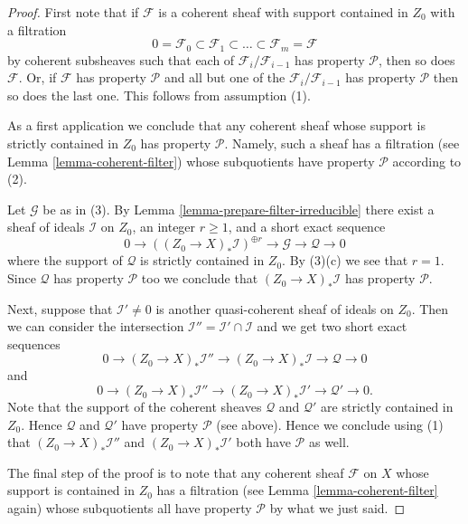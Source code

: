 \begin{proof}
First note that if $\mathcal{F}$ is a coherent sheaf with support
contained in $Z_0$ with a filtration
$$
0 = \mathcal{F}_0 \subset \mathcal{F}_1 \subset
\ldots \subset \mathcal{F}_m = \mathcal{F}
$$
by coherent subsheaves such that each of $\mathcal{F}_i/\mathcal{F}_{i - 1}$
has property $\mathcal{P}$, then so does $\mathcal{F}$. Or, if $\mathcal{F}$
has property $\mathcal{P}$ and all but one of the
$\mathcal{F}_i/\mathcal{F}_{i - 1}$ has property $\mathcal{P}$ then
so does the last one. This follows from assumption (1).

\medskip\noindent
As a first application we conclude that any coherent sheaf whose support
is strictly contained in $Z_0$ has property $\mathcal{P}$. Namely, such a
sheaf has a filtration (see Lemma \ref{lemma-coherent-filter})
whose subquotients have property $\mathcal{P}$ according to (2).

\medskip\noindent
Let $\mathcal{G}$ be as in (3). By Lemma \ref{lemma-prepare-filter-irreducible}
there exist a sheaf of ideals $\mathcal{I}$ on $Z_0$, an
integer $r \geq 1$, and a short exact sequence
$$
0 \to
\left((Z_0 \to X)_*\mathcal{I}\right)^{\oplus r} \to
\mathcal{G} \to
\mathcal{Q} \to 0
$$
where the support of $\mathcal{Q}$ is strictly contained in $Z_0$.
By (3)(c) we see that $r = 1$. Since $\mathcal{Q}$ has property $\mathcal{P}$
too we conclude that $(Z_0 \to X)_*\mathcal{I}$ has property
$\mathcal{P}$.

\medskip\noindent
Next, suppose that $\mathcal{I}' \not = 0$ is another quasi-coherent
sheaf of ideals on $Z_0$. Then we can consider the intersection
$\mathcal{I}'' = \mathcal{I}' \cap \mathcal{I}$ and we get
two short exact sequences
$$
0 \to
(Z_0 \to X)_*\mathcal{I}'' \to
(Z_0 \to X)_*\mathcal{I} \to
\mathcal{Q} \to 0
$$
and
$$
0 \to
(Z_0 \to X)_*\mathcal{I}'' \to
(Z_0 \to X)_*\mathcal{I}' \to
\mathcal{Q}' \to 0.
$$
Note that the support of the coherent sheaves $\mathcal{Q}$ and
$\mathcal{Q}'$ are strictly contained in $Z_0$.
Hence $\mathcal{Q}$ and $\mathcal{Q}'$ have property $\mathcal{P}$
(see above). Hence we conclude using (1)
that $(Z_0 \to X)_*\mathcal{I}''$ and $(Z_0 \to X)_*\mathcal{I}'$
both have $\mathcal{P}$ as well.

\medskip\noindent
The final step of the proof is to note that any coherent sheaf
$\mathcal{F}$ on $X$ whose support is contained in $Z_0$ has a filtration
(see Lemma \ref{lemma-coherent-filter} again) whose subquotients
all have property $\mathcal{P}$ by what we just said.
\end{proof}

